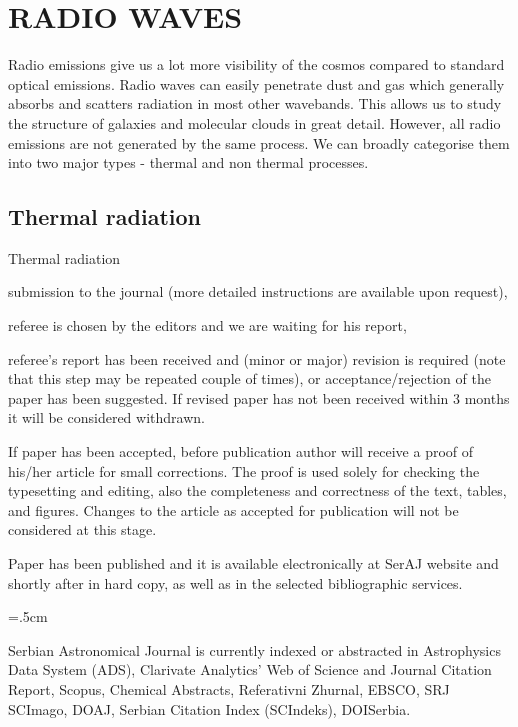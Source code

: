 \documentclass{article_saj}
\begin{document}
\section{RADIO WAVES}




Radio emissions give us a lot more visibility of the cosmos compared to standard optical emissions. Radio waves can easily penetrate dust and gas which generally absorbs and scatters radiation in most other wavebands. This allows us to study the structure of galaxies and molecular clouds in great detail. However, all radio emissions are not generated by the same process. We can broadly categorise them into two major types - thermal and non thermal processes.

\subsection{Thermal radiation}

Thermal radiation 

\par\hang{} submission to the journal (more detailed instructions are available upon
request),

\par\hang{} referee is chosen by the editors and we are
waiting for his report,

\par\hang{} referee's report has been received and (minor or major)
revision is required (note that this step may be repeated couple
of times), or acceptance/rejection of the paper has been
suggested. If revised paper has not been received within 3 months it will be
considered withdrawn.

\par\hang{} If paper has been accepted, before publication author
will receive a proof of his/her article for small corrections. The
proof is used solely for checking the typesetting and editing,
also the completeness and correctness of the text, tables, and
figures. Changes to the article as accepted for publication will
not be considered at this stage.

\par\hang{} Paper has been published and it is available electronically at SerAJ website and
shortly after in hard copy, as well
as in the selected bibliographic services.

\parindent=.5cm

Serbian Astronomical Journal is currently indexed or abstracted in
Astrophysics Data System (ADS),
Clarivate Analytics' Web of Science and Journal Citation Report,
Scopus, Chemical Abstracts, Referativni Zhurnal, EBSCO, SRJ SCImago,
DOAJ, Serbian Citation Index (SCIndeks), DOISerbia.
\end{document}
